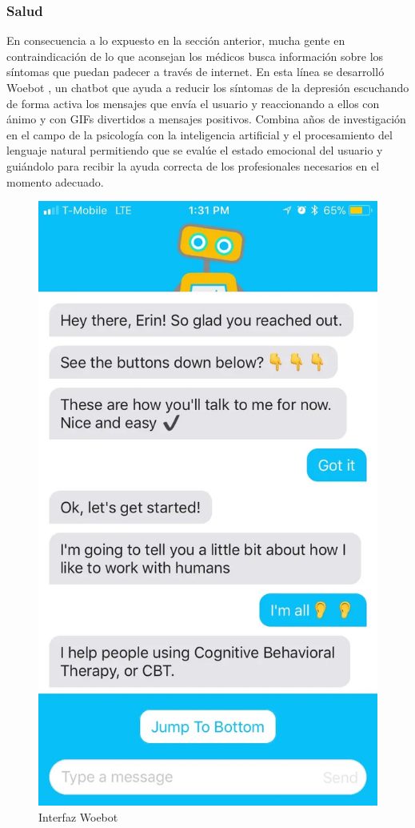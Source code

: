 \subsubsection{Salud}
En consecuencia a lo expuesto en la sección anterior, mucha gente en contraindicación de lo que aconsejan los médicos busca información sobre los síntomas que puedan padecer a través de internet. En esta línea se desarrolló Woebot \cite{woebot}, un chatbot que ayuda a reducir los síntomas de la depresión escuchando de forma activa los mensajes que envía el usuario y reaccionando a ellos con ánimo y con GIFs divertidos a mensajes positivos. Combina años de investigación en el campo de la psicología con la inteligencia artificial y el procesamiento del lenguaje natural permitiendo que se evalúe el estado emocional del usuario y guiándolo para recibir la ayuda correcta de los profesionales necesarios en el momento adecuado.

\begin{figure}[H]
    \centering
    \includegraphics[scale=0.15]{include/figuras/woebot.jpg}
    \caption{Interfaz Woebot}
    \label{fig:woebot}
\end{figure}


